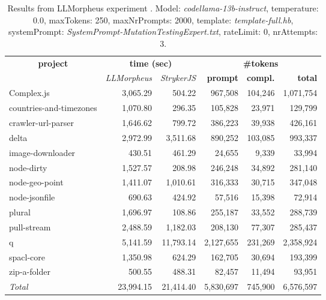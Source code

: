 
\begin{table*}[hbt!]
\centering
{\scriptsize
\begin{tabular}{l||r|r|r|r|r}
\multicolumn{1}{c|}{\bf project} & \multicolumn{2}{|c|}{\bf time (sec)} & \multicolumn{3}{|c|}{\bf \#tokens} \\
               & {\it LLMorpheus} & {\it StrykerJS} & {\bf prompt} & {\bf compl.} & {\bf total} \\
\hline
  Complex.js & 3,065.29 & 504.22 & 967,508 & 104,246 & 1,071,754 \\ 
countries-and-timezones & 1,070.80 & 296.35 & 105,828 & 23,971 & 129,799 \\ 
crawler-url-parser & 1,646.62 & 799.72 & 386,223 & 39,938 & 426,161 \\ 
delta & 2,972.99 & 3,511.68 & 890,252 & 103,085 & 993,337 \\ 
image-downloader & 430.51 & 461.29 & 24,655 & 9,339 & 33,994 \\ 
node-dirty & 1,527.57 & 208.98 & 246,248 & 34,892 & 281,140 \\ 
node-geo-point & 1,411.07 & 1,010.61 & 316,333 & 30,715 & 347,048 \\ 
node-jsonfile & 690.63 & 424.92 & 57,516 & 15,398 & 72,914 \\ 
plural & 1,696.97 & 108.86 & 255,187 & 33,552 & 288,739 \\ 
pull-stream & 2,488.59 & 1,182.03 & 208,130 & 77,307 & 285,437 \\ 
q & 5,141.59 & 11,793.14 & 2,127,655 & 231,269 & 2,358,924 \\ 
spacl-core & 1,350.98 & 624.29 & 162,705 & 30,694 & 193,399 \\ 
zip-a-folder & 500.55 & 488.31 & 82,457 & 11,494 & 93,951 \\ 
\hline
  \textit{Total} & 23,994.15 & 21,414.40 & 5,830,697 & 745,900 & 6,576,597 \\
  \end{tabular}
  }
  \\[2mm]
  \caption{Results from LLMorpheus experiment .
    Model: \textit{codellama-13b-instruct}, 
    temperature: 0.0, 
    maxTokens: 250, 
    maxNrPrompts: 2000, 
    template: \textit{template-full.hb}, 
    systemPrompt: \textit{SystemPrompt-MutationTestingExpert.txt}, 
    rateLimit: 0, 
    nrAttempts: 3.  
  }
  \label{table:Cost:run355:codellama-13b-instruct:template-full.hb:0.0}
\end{table*}